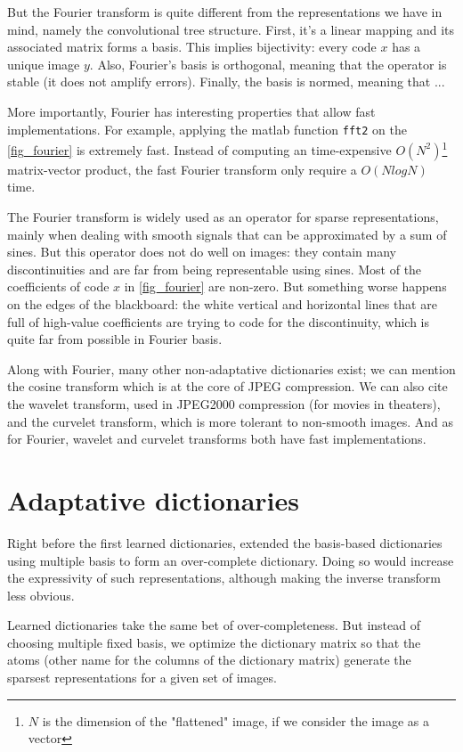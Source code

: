 But the Fourier transform is quite different from the representations we have in mind, namely the convolutional tree structure. First, it's a linear mapping and its associated matrix forms a basis. This implies bijectivity: every code $x$ has a unique image $y$. Also, Fourier's basis is orthogonal, meaning that the operator is stable (it does not amplify errors). Finally, the basis is normed, meaning that ... %

More importantly, Fourier has interesting properties that allow fast implementations. For example, applying the matlab function \texttt{fft2} on the \cref{fig_fourier} is extremely fast. Instead of computing an time-expensive $O(N^2)$\footnote{$N$ is the dimension of the "flattened" image, if we consider the image as a vector} matrix-vector product, the fast Fourier transform only require a $O(NlogN)$ time.

The Fourier transform is widely used as an operator for sparse representations, mainly when dealing with smooth signals that can be approximated by a sum of sines. But this operator does not do well on images: they contain many discontinuities and are far from being representable using sines. Most of the coefficients of code $x$ in \cref{fig_fourier} are non-zero. But something worse happens on the edges of the blackboard: the white vertical and horizontal lines that are full of high-value coefficients are trying to code for the discontinuity, which is quite far from possible in Fourier basis.

Along with Fourier, many other non-adaptative dictionaries exist; we can mention the cosine transform which is at the core of JPEG compression. We can also cite the wavelet transform, used in JPEG2000 compression (for movies in theaters), and the curvelet transform, which is more tolerant to non-smooth images. And as for Fourier, wavelet and curvelet transforms both have fast implementations.


\section{Adaptative dictionaries}
Right before the first learned dictionaries, \cite{chen_atomic_2001} extended the basis-based dictionaries using multiple basis to form an over-complete dictionary. Doing so would increase the expressivity of such representations, although making the inverse transform less obvious. %

Learned dictionaries take the same bet of over-completeness. But instead of choosing multiple fixed basis, we optimize the dictionary matrix so that the atoms (other name for the columns of the dictionary matrix) generate the sparsest representations for a given set of images.

